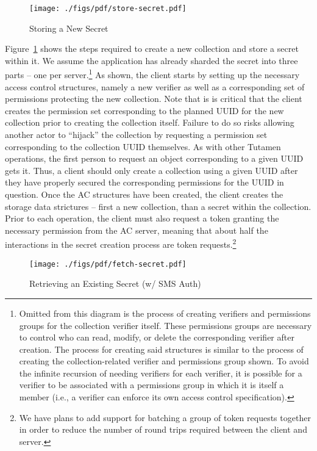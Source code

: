 \begin{figure}[th]
  \centering
  \texttt{[image: ./figs/pdf/store-secret.pdf]}
  \caption{Storing a New Secret}
  \label{fig:tutamen:storesecret}
\end{figure}

Figure~\ref{fig:tutamen:storesecret} shows the steps required to
create a new collection and store a secret within it. We assume the
application has already sharded the secret into three parts -- one per
server.\footnote{Omitted from this diagram is the process of creating
  verifiers and permissions groups for the collection verifier
  itself. These permissions groups are necessary to control who can
  read, modify, or delete the corresponding verifier after
  creation. The process for creating said structures is similar to the
  process of creating the collection-related verifier and permissions
  group shown. To avoid the infinite recursion of needing verifiers
  for each verifier, it is possible for a verifier to be associated
  with a permissions group in which it is itself a member (i.e., a
  verifier can enforce its own access control specification).} As
shown, the client starts by setting up the necessary access control
structures, namely a new verifier as well as a corresponding set of
permissions protecting the new collection. Note that is is critical
that the client creates the permission set corresponding to the
planned UUID for the new collection prior to creating the collection
itself. Failure to do so risks allowing another actor to ``hijack''
the collection by requesting a permission set corresponding to the
collection UUID themselves. As with other Tutamen operations, the
first person to request an object corresponding to a given UUID gets
it. Thus, a client should only create a collection using a given UUID
after they have properly secured the corresponding permissions for the
UUID in question. Once the AC structures have been created, the client
creates the storage data strictures -- first a new collection, than a
secret within the collection. Prior to each operation, the client must
also request a token granting the necessary permission from the AC
server, meaning that about half the interactions in the secret
creation process are token requests.\footnote{We have plans to add
  support for batching a group of token requests together in order to
  reduce the number of round trips required between the client and
  server.}

\begin{figure}[th]
  \centering
  \texttt{[image: ./figs/pdf/fetch-secret.pdf]}
  \caption{Retrieving an Existing Secret (w/ SMS Auth)}
  \label{fig:tutamen:fetchsecret}
\end{figure}

